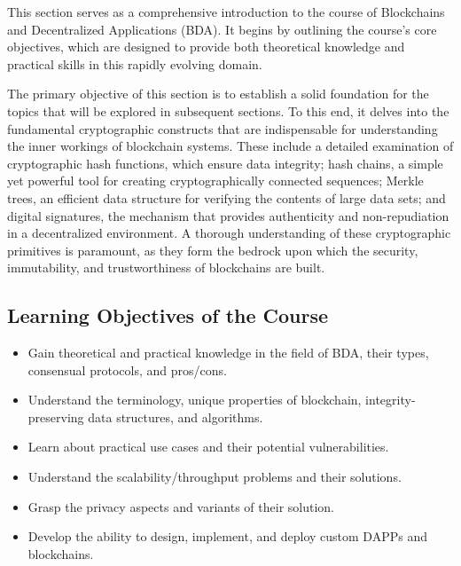 
This section serves as a comprehensive introduction to the course of
Blockchains and Decentralized Applications (BDA). It begins by outlining
the course's core objectives, which are designed to provide both
theoretical knowledge and practical skills in this rapidly evolving
domain. 

The primary objective of this section is to establish a solid foundation
for the topics that will be explored in subsequent sections. To this
end, it delves into the fundamental cryptographic constructs that are
indispensable for understanding the inner workings of blockchain
systems. These include a detailed examination of cryptographic hash
functions, which ensure data integrity; hash chains, a simple yet
powerful tool for creating cryptographically connected sequences; Merkle trees, an
efficient data structure for verifying the contents of large data sets;
and digital signatures, the mechanism that provides authenticity and
non-repudiation in a decentralized environment. A thorough understanding
of these cryptographic primitives is paramount, as they form the bedrock
upon which the security, immutability, and trustworthiness of
blockchains are built.

\subsection{Learning Objectives of the Course}\label{learning-objectives}

\begin{itemize}
	\tightlist
	\item
	Gain theoretical and practical knowledge in the field of BDA, their
	types, consensual protocols, and pros/cons.
	\item
	Understand the terminology, unique properties of blockchain,
	integrity-preserving data structures, and algorithms.
	\item
	Learn about practical use cases and their potential vulnerabilities.
	\item
	Understand the scalability/throughput problems and their solutions.
	\item
	Grasp the privacy aspects and variants of their solution.
	\item
	Develop the ability to design, implement, and deploy custom DAPPs and
	blockchains.
\end{itemize}

